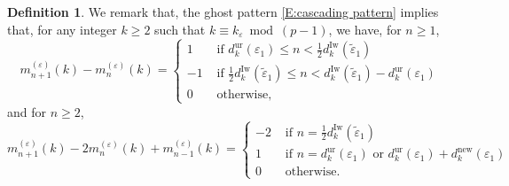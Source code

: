 \documentclass[12pt]{amsart}
\theoremstyle{definition}
\newtheorem{definition}[subsection]{Definition}
\newtheorem{notation}[subsection]{Notation}
\numberwithin{equation}{subsection}
\def\gothm{\mathfrak{m}}
\def\CC{\mathbb{C}}
\newcommand{\new}{\mathrm{new}}
\newcommand{\Iw}{\mathrm{Iw}}
\newcommand{\unr}{\mathrm{ur}}
\begin{document}
\begin{definition}
We remark that, the ghost pattern \eqref{E:cascading pattern} implies that, for any integer $k \geq 2$ such that $k \equiv k_\varepsilon \bmod {(p-1)}$, we have, for $n\geq 1$,
\begin{equation}
\label{E:increment of multiplicity}
m_{n+1}^{(\varepsilon)}(k) -m_{n}^{(\varepsilon)}(k) = \begin{cases}
1 & \textrm{ if }  d_{k}^\unr(\varepsilon_1)  \leq n< \frac 12 d_{k}^\Iw(\tilde \varepsilon_1)
\\
-1 & \textrm{ if }\frac 12 d_{k}^\Iw(\tilde \varepsilon_1) \leq n < d_{k}^\Iw(\tilde \varepsilon_1) - d_{k}^\unr(\varepsilon_1)
\\
0 & \textrm{ otherwise,}
\end{cases}
\end{equation}
and for $n \geq 2$,
\begin{equation}
\label{E:second order increment of multiplicity}
m_{n+1}^{(\varepsilon)}(k) -2m_n^{(\varepsilon)}(k) +m_{n-1}^{(\varepsilon)}(k) = \begin{cases}
-2 & \textrm{ if }  n = \frac 12 d_{k}^\Iw(\tilde \varepsilon_1)
\\
1 & \textrm{ if }n =  d_{k}^\unr(\varepsilon_1) \textrm{ or } d_{k}^\unr(\varepsilon_1)+d_{k}^{\new}(\varepsilon_1)
\\
0 & \textrm{ otherwise.}
\end{cases}
\end{equation}
\end{definition}


\end{document}

